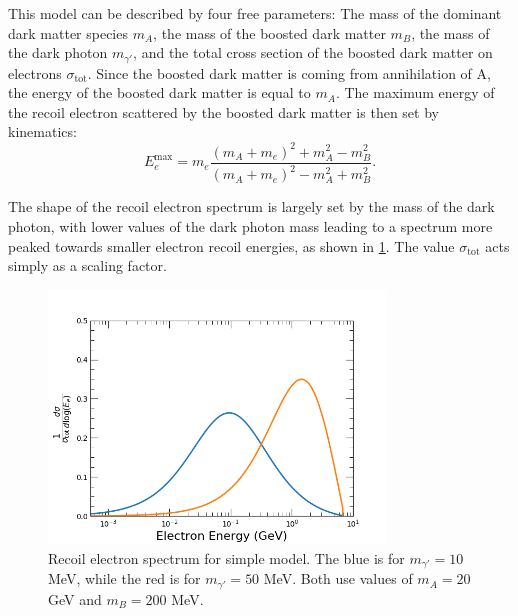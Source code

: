 This model can be described by four free parameters: The mass of the dominant dark matter species $m_A$, the mass of the boosted dark matter $m_B$, the mass of the dark photon $m_{\gamma '}$, and the total cross section of the boosted dark matter on electrons $\sigma_\textrm{tot}$.  Since the boosted dark matter is coming from annihilation of A, the energy of the boosted dark matter is equal to $m_A$.  The maximum energy of the recoil electron scattered by the boosted dark matter is then set by kinematics:
\begin{equation}
E_e^\textrm{max}=m_e\frac{(m_A+m_e)^2+m_A^2-m_B^2}{(m_A+m_e)^2-m_A^2+m_B^2}.
\label{eq:emax}
\end{equation} 

The shape of the recoil electron spectrum is largely set by the mass of the dark photon, with lower values of the dark photon mass leading to a spectrum more peaked towards smaller electron recoil energies, as shown in \cref{fig:recoil_spec}.   The value $\sigma_\textrm{tot}$ acts simply as a scaling factor.

 \begin{figure}
\includegraphics[width=0.8\textwidth]{figures/recoil_electron_spectrum.png}
\caption{Recoil electron spectrum for simple model.  The blue is for $m_{\gamma '}=10$ MeV, while the red is for $m_{\gamma '}=50$ MeV.  Both use values of $m_A=20$ GeV and $m_B=200$ MeV.}
\label{fig:recoil_spec}
\end{figure}

